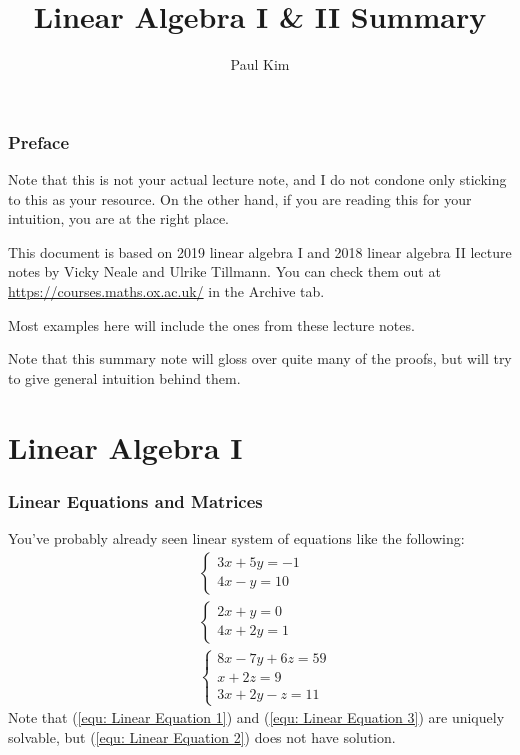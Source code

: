 \documentclass[12pt, a4paper]{article}
\title{Linear Algebra I \& II Summary}
\author{Paul Kim}
\theoremstyle{remark}
\theoremstyle{definition}
\numberwithin{equation}{section}
\numberwithin{definition}{section}
\numberwithin{example}{section}
\numberwithin{exercise}{section}
\numberwithin{remark}{section}
\numberwithin{figure}{section}
\begin{document}
\maketitle

\section*{Preface}
Note that this is not your actual lecture note,
and I do not condone only sticking to this as your resource.
On the other hand, if you are reading this for your intuition,
you are at the right place.

This document is based on 2019 linear algebra I and 2018 linear algebra II lecture notes by Vicky Neale and Ulrike Tillmann.
You can check them out at \url{https://courses.maths.ox.ac.uk/} in the Archive tab.

Most examples here will include the ones from these lecture notes.

Note that this summary note will gloss over quite many of the proofs, but will try to give general intuition behind them.

\newpage
\part{Linear Algebra I}
\newpage

\section{Linear Equations and Matrices}
You've probably already seen linear system of equations like the following:
\begin{align}
    &
    \begin{cases}
        3x + 5y = -1 \\
        4x - y = 10
    \end{cases}
    \label{equ: Linear Equation 1}
    \\
    &
    \begin{cases}
        2x + y = 0 \\
        4x + 2y = 1
    \end{cases}
    \label{equ: Linear Equation 2}
    \\
    &
    \begin{cases}
        8x - 7y + 6z = 59 \\
        x + 2z = 9 \\
        3x + 2y - z = 11
    \end{cases}
    \label{equ: Linear Equation 3}
\end{align}
Note that (\ref{equ: Linear Equation 1}) and (\ref{equ: Linear Equation 3}) are uniquely solvable, but (\ref{equ: Linear Equation 2}) does not have solution.
\end{document}
